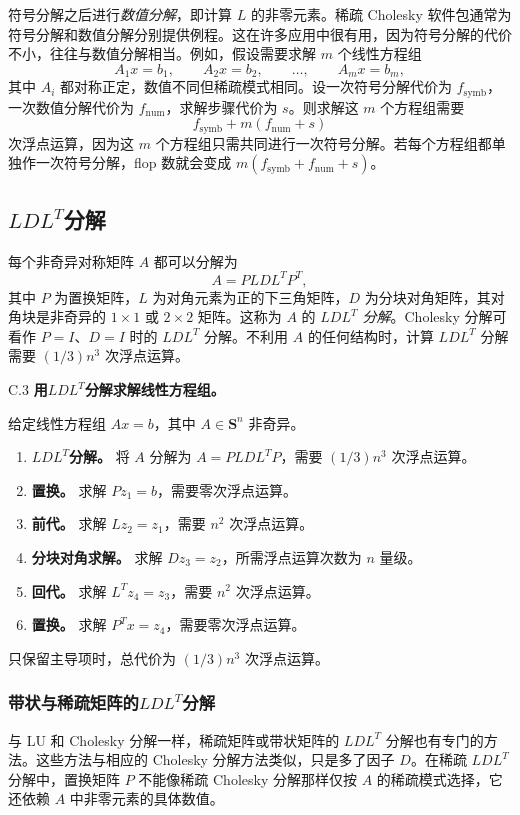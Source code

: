 符号分解之后进行\emph{数值分解}，即计算 $L$ 的非零元素。稀疏 Cholesky 软件包通常为符号分解和数值分解分别提供例程。这在许多应用中很有用，因为符号分解的代价不小，往往与数值分解相当。例如，假设需要求解 $m$ 个线性方程组
\[
 A_1x=b_1,\qquad A_2x=b_2,\qquad\ldots,\qquad A_mx=b_m,
\]
其中 $A_i$ 都对称正定，数值不同但稀疏模式相同。设一次符号分解代价为 $f_{\mathrm{symb}}$，一次数值分解代价为 $f_{\mathrm{num}}$，求解步骤代价为 $s$。则求解这 $m$ 个方程组需要
\[
 f_{\mathrm{symb}}+m(f_{\mathrm{num}}+s)
\]
次浮点运算，因为这 $m$ 个方程组只需共同进行一次符号分解。若每个方程组都单独作一次符号分解，flop 数就会变成 $m(f_{\mathrm{symb}}+f_{\mathrm{num}}+s)$。

\subsection{\texorpdfstring{$LDL^T$}{LDLT}分解}
每个非奇异对称矩阵 $A$ 都可以分解为
\[
 A=PLDL^TP^T,
\]
其中 $P$ 为置换矩阵，$L$ 为对角元素为正的下三角矩阵，$D$ 为分块对角矩阵，其对角块是非奇异的 $1\times1$ 或 $2\times2$ 矩阵。这称为 $A$ 的 \emph{$LDL^T$ 分解}。Cholesky 分解可看作 $P=I$、$D=I$ 时的 $LDL^T$ 分解。不利用 $A$ 的任何结构时，计算 $LDL^T$ 分解需要 $(1/3)n^3$ 次浮点运算。

\begin{origalgorithm}{C.3}
\textbf{用$LDL^T$分解求解线性方程组。}

给定线性方程组 $Ax=b$，其中 $A\in\mathbf S^n$ 非奇异。
\begin{enumerate}
\item \textbf{$LDL^T$分解。} 将 $A$ 分解为 $A=PLDL^TP$，需要 $(1/3)n^3$ 次浮点运算。
\item \textbf{置换。} 求解 $Pz_1=b$，需要零次浮点运算。
\item \textbf{前代。} 求解 $Lz_2=z_1$，需要 $n^2$ 次浮点运算。
\item \textbf{分块对角求解。} 求解 $Dz_3=z_2$，所需浮点运算次数为 $n$ 量级。
\item \textbf{回代。} 求解 $L^Tz_4=z_3$，需要 $n^2$ 次浮点运算。
\item \textbf{置换。} 求解 $P^Tx=z_4$，需要零次浮点运算。
\end{enumerate}
\end{origalgorithm}
只保留主导项时，总代价为 $(1/3)n^3$ 次浮点运算。

\subsubsection*{带状与稀疏矩阵的$LDL^T$分解}
与 LU 和 Cholesky 分解一样，稀疏矩阵或带状矩阵的 $LDL^T$ 分解也有专门的方法。这些方法与相应的 Cholesky 分解方法类似，只是多了因子 $D$。在稀疏 $LDL^T$ 分解中，置换矩阵 $P$ 不能像稀疏 Cholesky 分解那样仅按 $A$ 的稀疏模式选择，它还依赖 $A$ 中非零元素的具体数值。

